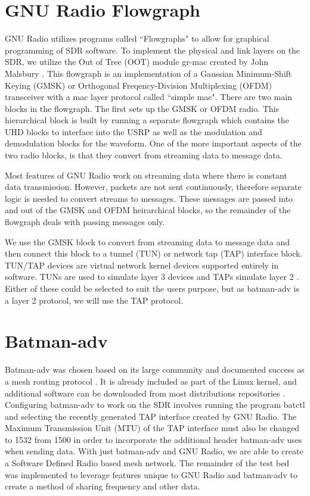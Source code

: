 \section{GNU Radio Flowgraph}

GNU Radio utilizes programs called ``Flowgraphs" to allow for graphical programming of SDR software. To implement the physical and link layers on the SDR, we utilize the Out of Tree (OOT) module gr-mac created by John Malsbury \cite{0015}. This flowgraph is an implementation of a Gaussian Minimum-Shift Keying (GMSK) or Orthogonal Freqency-Division Multiplexing (OFDM) transceiver with a mac layer protocol called ``simple mac". There are two main blocks in the flowgraph. The first sets up the GMSK or OFDM radio. This hierarchical block is built by running a separate flowgraph which contains the UHD blocks to interface into the USRP as well as the modulation and demodulation blocks for the waveform. One of the more important aspects of the two radio blocks, is that they convert from streaming data to message data. 

Most features of GNU Radio work on streaming data where there is constant data transmission. However, packets are not sent continuously, therefore separate logic is needed to convert streams to messages. These messages are passed into and out of the GMSK and OFDM heirarchical blocks, so the remainder of the flowgraph deals with passing messages only. 

We use the GMSK block to convert from streaming data to message data and then connect this block to a tunnel (TUN) or network tap (TAP) interface block. TUN/TAP devices are virtual network kernel devices supported entirely in software. TUNs are used to simulate layer 3 devices and TAPs simulate layer 2 \cite{0017}. Either of these could be selected to suit the users purpose, but as batman-adv is a layer 2 protocol, we will use the TAP protocol.

\section{Batman-adv}

Batman-adv was chosen based on its large community and documented success as a mesh routing protocol \cite{5375690}. It is already included as part of the Linux kernel, and additional software can be downloaded from most distributions repositories \cite{0008}. Configuring batman-adv to work on the SDR involves running the program batctl and selecting the recently generated TAP interface created by GNU Radio. The Maximum Transmission Unit (MTU) of the TAP interface must also be changed to 1532 from 1500 in order to incorporate the additional header batman-adv uses when sending data. With just batman-adv and GNU Radio, we are able to create a Software Defined Radio based mesh network. The remainder of the test bed was implemented to leverage features unique to GNU Radio and batman-adv to create a method of sharing frequency and other data. 

